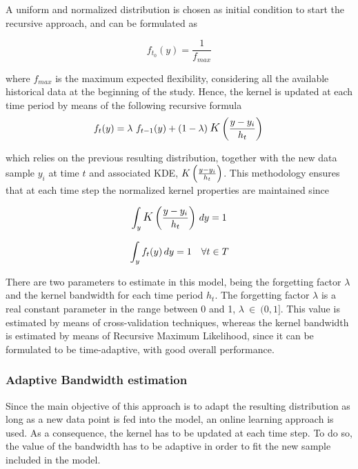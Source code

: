 A uniform and normalized distribution is chosen as initial condition to start the recursive approach, and can be formulated as

\begin{equation}
    f_{t_{0}}(y) = \frac{1}{f_{max}}
\end{equation}

where $f_{max}$ is the maximum expected flexibility, considering all the available historical data at the beginning of the study. Hence, the kernel is updated at each time period by means of the following recursive formula 
\begin{equation} \label{eq:recursive_formula}
    f_{t}(y) = \lambda\ f_{t-1}(y) + (1-\lambda) \: \mathlarger{K}\left(\frac{y - y_{i}}{h_{t}}\right) \\
\end{equation}

which relies on the previous resulting distribution, together with the new data sample $y_{i}$ at time $t$ and associated KDE, $\mathlarger{K}\left(\frac{y - y_{i}}{h_{t}}\right)$. This methodology ensures that at each time step the normalized kernel properties are maintained since

\begin{equation}
  \int_{y} \mathlarger{K}\left(\frac{y - y_{i}}{h_{t}}\right) \, dy = 1 \\  
\end{equation}

\begin{equation}
  \int_{y} f_{t}(y) \, dy = 1  \quad \forall t \in T \\  
\end{equation}

There are two parameters to estimate in this model, being the forgetting factor $\lambda$ and the kernel bandwidth for each time period ${h}_{t}$. The forgetting factor $\lambda$ is a real constant parameter in the range between 0 and 1, $\lambda\ \in\ (0,1]$. This value is estimated by means of cross-validation techniques, whereas the kernel bandwidth is estimated by means of Recursive Maximum Likelihood, since it can be formulated to be time-adaptive, with good overall performance. 


\subsubsection{Adaptive Bandwidth estimation}
Since the main objective of this approach is to adapt the resulting distribution as long as a new data point is fed into the model, an online learning approach is used. As a consequence, the kernel has to be updated at each time step. To do so, the value of the bandwidth has to be adaptive in order to fit the new sample included in the model.

